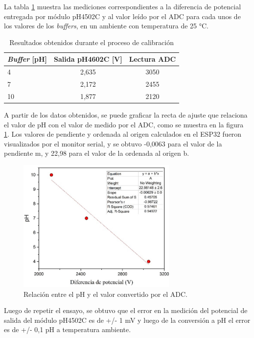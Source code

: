 La tabla \ref{tab:ensayoCalibracion} muestra las mediciones correspondientes a la diferencia de potencial entregada por módulo pH4502C y al valor leído por el ADC para cada unos de los valores de los \textit{buffers}, en un ambiente con temperatura de 25 °C.

\begin{table}[h]
	\centering
	\caption[Resultados calibración]{Resultados obtenidos durante el proceso de calibración}
	\begin{tabular}{l c c }    
		\toprule
		\textbf{\textit{Buffer} [pH]} & \textbf{Salida pH4602C [V] }	&    \textbf{Lectura ADC}  \\
		\midrule
		4 	& 2,635 & 3050 \\		
		7	& 2,172 & 2455 \\
		10	& 1,877 & 2120 \\
		\bottomrule
		\hline
	\end{tabular}
	\label{tab:ensayoCalibracion}
\end{table}

A partir de los datos obtenidos, se puede graficar la recta de ajuste que relaciona el valor de pH con el valor de medido por el ADC, como se muestra en la figura \ref{fig:rectaADC}. Los valores de pendiente y ordenada al origen calculados en el ESP32 fueron visualizados por el monitor serial, y se obtuvo -0,0063 para el valor de la pendiente m, y 22,98 para el valor de la ordenada al origen b. 

\begin{figure}[htbp]
	\centering
	\includegraphics[width=0.7\textwidth]{./Figures/rectaADC.jpg}
	\caption{Relación entre el pH y el valor convertido por el ADC.}
	\label{fig:rectaADC}
\end{figure}

Luego de repetir el ensayo, se obtuvo que el error en la medición del potencial de salida del módulo pH4502C es de +/- 1 mV y luego de la conversión a pH el error es de +/- 0,1 pH a temperatura ambiente. 


